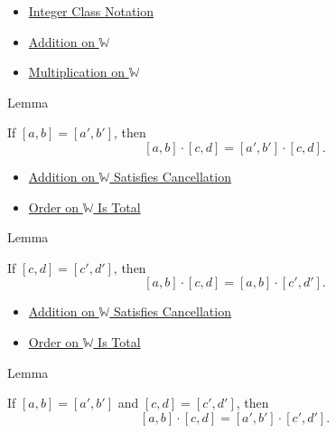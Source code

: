 \begin{dependencies}
\begin{itemize}
  \item \hyperref[def:integer-class-notation]{Integer Class Notation}
  \item \hyperref[def:addition-on-w]{Addition on $\mathbb{W}$}
  \item \hyperref[def:multiplication-on-w]{Multiplication on $\mathbb{W}$}
\end{itemize}
\end{dependencies}

\begin{lemmabox}{Lemma}
\begin{lemma}
\label{lem:multiplication-on-z-classes-respects-left-equivalence}
If $[a,b]=[a',b']$, then
\[
[a,b]\cdot[c,d]=[a',b']\cdot[c,d].
\]
\end{lemma}
\end{lemmabox}

\begin{dependencies}
\begin{itemize}
  \item \hyperref[thm:addition-on-w-cancellation]{Addition on $\mathbb{W}$ Satisfies Cancellation}
  \item \hyperref[thm:order-on-w-total]{Order on $\mathbb{W}$ Is Total}
\end{itemize}
\end{dependencies}

\begin{lemmabox}{Lemma}
\begin{lemma}
\label{lem:multiplication-on-z-classes-respects-right-equivalence}
If $[c,d]=[c',d']$, then
\[
[a,b]\cdot[c,d]=[a,b]\cdot[c',d'].
\]
\end{lemma}
\end{lemmabox}

\begin{dependencies}
\begin{itemize}
  \item \hyperref[thm:addition-on-w-cancellation]{Addition on $\mathbb{W}$ Satisfies Cancellation}
  \item \hyperref[thm:order-on-w-total]{Order on $\mathbb{W}$ Is Total}
\end{itemize}
\end{dependencies}

\begin{lemmabox}{Lemma}
\begin{lemma}
\label{lem:multiplication-on-z-classes-respects-equivalence}
If $[a,b]=[a',b']$ and $[c,d]=[c',d']$, then
\[
[a,b]\cdot[c,d]=[a',b']\cdot[c',d'].
\]
\end{lemma}
\end{lemmabox}

